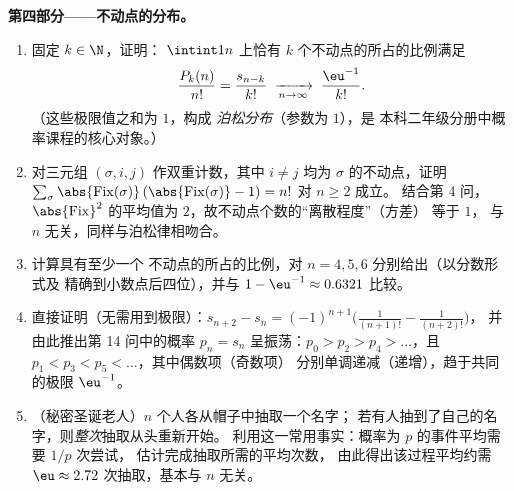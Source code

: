 \begin{problem}
\medskip
\noindent\textbf{第四部分——不动点的分布。}
\begin{enumerate}[resume]
  \item 固定 $k \in \N$，证明：
        $\intint1n$ 上恰有 $k$ 个不动点的所占的比例满足
        \[
        \frac{P_k(n)}{n!} = \frac{s_{n-k}}{k!}
        \;\xrightarrow[n \to \infty]{}\; \frac{\eu^{-1}}{k!} .
        \]
        （这些极限值之和为 $1$，构成
        \emph{泊松分布}（参数为 $1$），是
        本科二年级分册中概率课程的核心对象。）
  \item 对三元组 $(\sigma, i, j)$ 作双重计数，其中 $i
        \neq j$ 均为 $\sigma$ 的不动点，证明
        $\sum_\sigma \abs{\mathrm{Fix}(\sigma)}\,
        (\abs{\mathrm{Fix}(\sigma)} - 1) = n!$ 对 $n \geq 2$ 成立。
        结合第 4 问，$\abs{\mathrm{Fix}}^2$ 的平均值为
        $2$，故不动点个数的“离散程度”（方差）
        等于 $1$，
        与 $n$ 无关，同样与泊松律相吻合。
  \item 计算具有至少一个
        不动点的所占的比例，对 $n = 4, 5, 6$ 分别给出（以分数形式及
        精确到小数点后四位），并与 $1 - \eu^{-1} \approx
        0.6321$ 比较。
  \item 直接证明（无需用到极限）：$s_{n+2} - s_n
        = (-1)^{n+1}\bigl(\frac1{(n+1)!} - \frac1{(n+2)!}\bigr)$，
        并由此推出第 14 问中的概率 $p_n = s_n$
        呈振荡：$p_0 > p_2 > p_4 > \dots$，且
        $p_1 < p_3 < p_5 < \dots$，其中偶数项（奇数项）
        分别单调递减（递增），趋于共同的极限
        $\eu^{-1}$。
  \item （秘密圣诞老人）$n$ 个人各从帽子中抽取一个名字；
        若有人抽到了自己的名字，则\emph{整次}抽取从头重新开始。
        利用这一常用事实：概率为
        $p$ 的事件平均需要 $1/p$ 次尝试，
        估计完成抽取所需的平均次数，
        由此得出该过程平均约需 $\eu \approx
        2.72$ 次抽取，基本与
        $n$ 无关。
\end{enumerate}


\end{problem}
